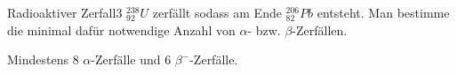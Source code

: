



\begin{problem}{Radioaktiver Zerfall}{3}
$_{92}^{238}U$ zerfällt sodass am Ende $_{82}^{206}Pb$ entsteht. Man bestimme die minimal dafür notwendige Anzahl von $\alpha$- bzw. $\beta$-Zerfällen.
\begin{solution}
Mindestens $8$ $\alpha$-Zerfälle und $6$ $\beta^-$-Zerfälle.
\end{solution}
\end{problem}

